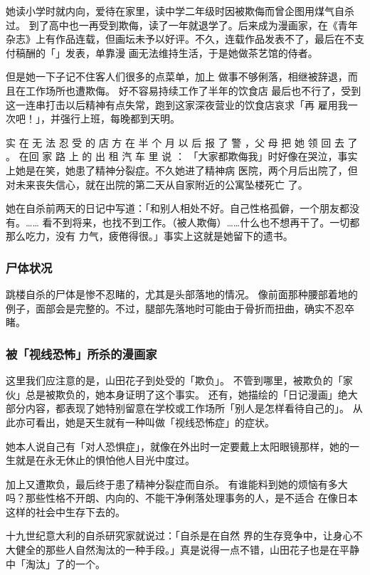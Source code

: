 \documentclass[UTF8]{ctexart}
\begin{document}
她读小学时就内向，爱待在家里，读中学二年级时因被欺侮而曾企图用煤气自杀过。
到了高中也一再受到欺侮，读了一年就退学了。后来成为漫画家，在《青年杂志》上有作品连载，但画坛未予以好评。不久，连载作品发表不了，最后在不支付稿酬的「\qquad \qquad 」发表，单靠漫 画无法维持生活，于是她做茶艺馆的侍者。

但是她一下子记不住客人们很多的点菜单，加上 做事不够俐落，相继被辞退，而且在工作场所也遭欺侮。
好不容易持续工作了半年的饮食店 最后也不行了，受到这一连串打击以后精神有点失常，跑到这家深夜营业的饮食店哀求「再 雇用我一次吧！」，并强行上班，每晚都到天明。

实 在 无 法 忍 受 的 店 方 在 半 个 月 以 后 报 了 警 ，父 母 把 她 领 回 去 了 。
在回 家 路 上 的 出 租 汽 车 里 说 ： 「大家都欺侮我」时好像在哭泣，事实上她是在笑，她患了精神分裂症。不久她进了精神病 医院，两个月后出院了，但对未来丧失信心，就在出院的第二天从自家附近的公寓坠楼死亡 了。

她在自杀前两天的日记中写道：「和别人相处不好。自己性格孤僻，一个朋友都没有。…… 看不到将来，也找不到工作。（被人欺侮）……什么也不想再干了。一切都那么吃力，没有 力气，疲倦得很。」事实上这就是她留下的遗书。

\subsubsection*{尸体状况}

跳楼自杀的尸体是惨不忍睹的，尤其是头部落地的情况。
像前面那种腰部着地的例子，面部会是完整的。不过，腿部先落地时可能由于骨折而扭曲，确实不忍卒睹。

\subsubsection*{被「视线恐怖」所杀的漫画家}

这里我们应注意的是，山田花子到处受的「欺负」。
不管到哪里，被欺负的「家伙」总是被欺负的，她本身证明了这个事实。
还有，她描绘的「日记漫画」绝大部分内容，都表现了她特别留意在学校或工作场所「别人是怎样看待自己的」。
从此亦可看出，她是天生就有一种叫做「视线恐怖症」的症状。

她本人说自己有「对人恐惧症」，就像在外出时一定要戴上太阳眼镜那样，她的一生就是在永无休止的惧怕他人目光中度过。

加上又遭欺负，最后终于患了精神分裂症而自杀。
有谁能料到她的烦恼有多大吗？那些性格不开朗、内向的、不能干净俐落处理事务的人，是不适合 在像日本这样的社会中生存下去的。

十九世纪意大利的自杀研究家就说过：「自杀是在自然 界的生存竞争中，让身心不大健全的那些人自然淘汰的一种手段。」真是说得一点不错，山田花子也是在平静中「淘汰」了的一个。 
\end{document}
